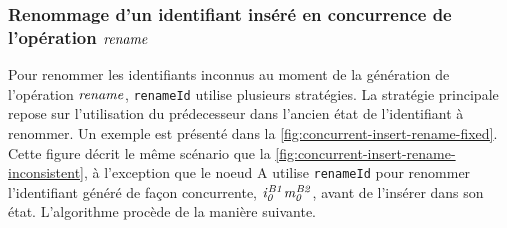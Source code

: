 \subsubsection{Renommage d'un identifiant inséré en concurrence de l'opération $\mathit{rename}$}

Pour renommer les identifiants inconnus au moment de la génération de l'opération $\mathit{rename}$, \texttt{renameId} utilise plusieurs stratégies.
La stratégie principale repose sur l'utilisation du prédecesseur dans l'ancien état de l'identifiant à renommer.
Un exemple est présenté dans la \autoref{fig:concurrent-insert-rename-fixed}.
Cette figure décrit le même scénario que la \autoref{fig:concurrent-insert-rename-inconsistent}, à l'exception que le noeud A utilise \texttt{renameId} pour renommer l'identifiant généré de façon concurrente, $\mathit{i}^{\mathit{B1}}_{\mathit{0}}\mathit{m}^{\mathit{B2}}_{\mathit{0}}$, avant de l'insérer dans son état.
L'algorithme procède de la manière suivante.

